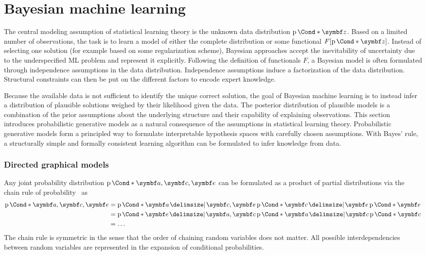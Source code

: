 \section{Bayesian machine learning}
\label{toc:bayesian_ml:bayesian_ml}
The central modeling assumption of statistical learning theory is the unknown data distribution $\Prob*{\mat{z}}$.
Based on a limited number of observations, the task is to learn a model of either the complete distribution or some functional $F[\Prob*{\mat{z}}]$.
Instead of selecting one solution (for example based on some regularization scheme), Bayesian approaches accept the inevitability of uncertainty due to the underspecified ML problem and represent it explicitly.
Following the definition of functionals $F$, a Bayesian model is often formulated through independence assumptions in the data distribution.
Independence assumptions induce a factorization of the data distribution.
Structural constraints can then be put on the different factors to encode expert knowledge.

Because the available data is not sufficient to identify the unique correct solution, the goal of Bayesian machine learning is to instead infer a distribution of plausible solutions weighed by their likelihood given the data.
The posterior distribution of plausible models is a combination of the prior assumptions about the underlying structure and their capability of explaining observations.
This section introduces probabilistic generative models as a natural consequence of the assumptions in statistical learning theory.
Probabilistic generative models form a principled way to formulate interpretable hypothesis spaces with carefully chosen assumptions.
With Bayes' rule, a structurally simple and formally consistent learning algorithm can be formulated to infer knowledge from data.

\subsubsection{Directed graphical models}
Any joint probability distribution $\Prob*{\mat{a}, \mat{c}, \mat{e}}$ can be formulated as a product of partial distributions via the chain rule of probability~\parencite{murphy_machine_2012} as
\begin{align}
    \begin{split}
        \Prob*{\mat{a}, \mat{c}, \mat{e}}
        &= \Prob*{\mat{a} \given \mat{c}, \mat{e}}\Prob*{\mat{c} \given \mat{e}}\Prob*{\mat{e}} \\
        &= \Prob*{\mat{e} \given \mat{a}, \mat{c}}\Prob*{\mat{a} \given \mat{c}}\Prob*{\mat{c}} \\
        &= \dots
    \end{split}
\end{align}
The chain rule is symmetric in the sense that the order of chaining random variables does not matter.
All possible interdependencies between random variables are represented in the expansion of conditional probabilities.

